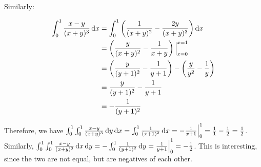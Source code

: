 Similarly:

\begin{align*}
  \int_0^1 \frac{x - y}{(x + y)^3} \mathop{}\!\mathrm{d} x &= \int_0^1 \left(\frac{1}{(x + y)^2} - \frac{2y}{(x + y)^3}\right) \mathop{}\!\mathrm{d} x \\
  &= \left(\frac{y}{(x + y)^2} - \frac{1}{x + y}\right)\Big|_{x = 0}^{x = 1} \\
  &= \left(\frac{y}{(y + 1)^2} - \frac{1}{y + 1}\right) - \left(\frac{y}{y^2} - \frac{1}{y}\right) \\
  &= \frac{y}{(y + 1)^2} - \frac{1}{y + 1} \\
  &= -\frac{1}{(y + 1)^2}
\end{align*}

Therefore, we have $\int_0^1 \int_0^1 \frac{x - y}{(x + y)^3} \mathop{}\!\mathrm{d} y \mathop{}\!\mathrm{d} x = \int_0^1 \frac{1}{(x + 1)^2} \mathop{}\!\mathrm{d} x = -\frac{1}{x + 1} \Big|_0^1 = \frac{1}{1} - \frac{1}{2} = \frac{1}{2}$. Similarly, $\int_0^1 \int_0^1 \frac{x - y}{(x + y)^3} \mathop{}\!\mathrm{d} x \mathop{}\!\mathrm{d} y = -\int_0^1 \frac{1}{(y + 1)^2} \mathop{}\!\mathrm{d} y = \frac{1}{y + 1} \Big|_0^1 = -\frac{1}{2}$. This is interesting, since the two are not equal, but are negatives of each other.

